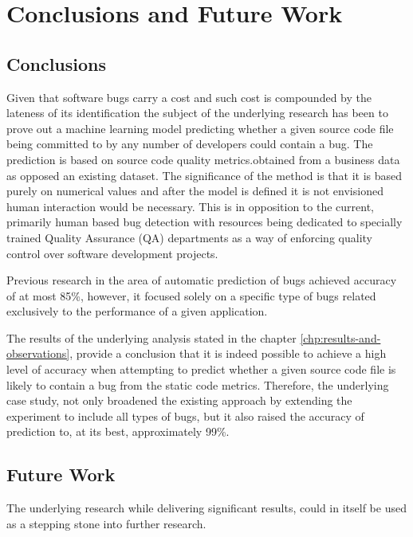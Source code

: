 \chapter{Conclusions and Future Work}\label{chp:conclusions-and-future-work}
\section{Conclusions}\label{sec:conlclusions}
Given that software bugs carry a cost and such cost is compounded by the lateness of its identification \cite{autoDetectionOfPerfBugs} the subject of the underlying research has been to prove out a machine learning model predicting whether a given source code file being committed to by any number of developers could contain a bug. The prediction is based on source code quality metrics.obtained from a business data as opposed an existing dataset. The significance of the method is that it is based purely on numerical values and after the model is defined it is not envisioned human interaction would be necessary. This is in opposition to the current, primarily human based bug detection with resources being dedicated to specially trained Quality Assurance (QA) departments as a way of enforcing quality control over software development projects. 

Previous research in the area of automatic prediction of bugs \cite{autoDetectionOfPerfBugs} achieved accuracy of at most 85\%, however, it focused solely on a specific type of bugs related exclusively to the performance of a given application. 

The results of the underlying analysis stated in the chapter \ref{chp:results-and-observations}, provide a conclusion that it is indeed possible to achieve a high level of accuracy when attempting to predict whether a given source code file is likely to contain a bug from the static code metrics. Therefore, the underlying case study, not only broadened the existing approach by extending the experiment to include all types of bugs, but it also raised the accuracy of prediction to, at its best, approximately 99\%.



\section{Future Work}\label{sec:future-work}
The underlying research while delivering significant results, could in itself be used as a stepping stone into further research.

